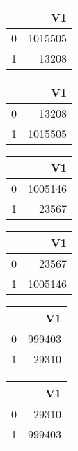 \bigskip\bigskip
\centering
\begin{tabular}{rr}
  \hline
 & V1 \\ 
  \hline
0 & 1015505 \\ 
  1 & 13208 \\ 
   \hline
\end{tabular}

\bigskip\bigskip
\centering
\begin{tabular}{rr}
  \hline
 & V1 \\ 
  \hline
0 & 13208 \\ 
  1 & 1015505 \\ 
   \hline
\end{tabular}

\bigskip\bigskip
\centering
\begin{tabular}{rr}
  \hline
 & V1 \\ 
  \hline
0 & 1005146 \\ 
  1 & 23567 \\ 
   \hline
\end{tabular}

\bigskip\bigskip
\centering
\begin{tabular}{rr}
  \hline
 & V1 \\ 
  \hline
0 & 23567 \\ 
  1 & 1005146 \\ 
   \hline
\end{tabular}

\bigskip\bigskip
\centering
\begin{tabular}{rr}
  \hline
 & V1 \\ 
  \hline
0 & 999403 \\ 
  1 & 29310 \\ 
   \hline
\end{tabular}

\bigskip\bigskip
\centering
\begin{tabular}{rr}
  \hline
 & V1 \\ 
  \hline
0 & 29310 \\ 
  1 & 999403 \\ 
   \hline
\end{tabular}

